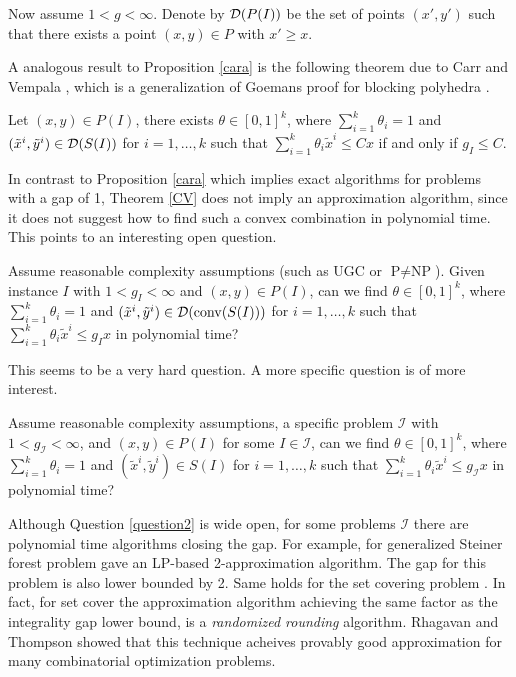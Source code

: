 \documentclass[runningheads]{llncs}
\begin{document}
Now assume $1<g<\infty$. Denote by $\operatorname{\mathcal{D}}(P(I))$ be the set of points $(x',y')$ such that there exists a point $(x,y)\in P$ with $x'\geq x$.

A analogous result to Proposition \ref{cara} is the following theorem due to Carr and Vempala \cite{CV}, which is a generalization of Goemans proof for blocking polyhedra \cite{goemans}. 

\begin{theorem} \label{CV}
	Let $(x,y)\in P(I)$, there exists $\theta \in [0,1]^k$, where $\sum_{i=1}^{k}\theta_i =1$ and $(\tilde{x}^i,\tilde{y}^i)\in \operatorname{\mathcal{D}}(S(I))$ for $i=1,\ldots,k$ such that $\sum_{i=1}^{k}\theta_i \tilde{x}^i\leq Cx$ if and only if $g_I \leq C$.
\end{theorem}

In contrast to Proposition \ref{cara} which implies exact algorithms for problems with a gap of 1, Theorem \ref{CV} does not imply an approximation algorithm, since it does not suggest how to find such a convex combination in polynomial time. This points to an interesting open question. 

\begin{question}\label{question1}
	Assume reasonable complexity assumptions (such as UGC or $\textrm{P}\neq \textrm{NP}$). Given instance $I$ with $1<g_I<\infty$ and $(x,y)\in P(I)$, can we find $\theta \in [0,1]^k$, where $\sum_{i=1}^{k}\theta_i =1$ and $(\tilde{x}^i,\tilde{y}^i)\in \operatorname{\mathcal{D}}(\operatorname{conv}(S(I)))$ for $i=1,\ldots,k$ such that $\sum_{i=1}^{k}\theta_i \tilde{x}^i\leq g_Ix$ in polynomial time?
\end{question}

This seems to be a very hard question. A more specific question is of more interest.

\begin{question}\label{question2}
	Assume reasonable complexity assumptions, a specific problem $\mathcal{I}$ with  $1<g_{\mathcal{I}}<\infty$, and $(x,y)\in P(I)$ for some $I\in \mathcal{I}$, can we find $\theta \in [0,1]^k$, where $\sum_{i=1}^{k}\theta_i =1$ and $(\tilde{x}^i,\tilde{y}^i)\in S(I)$ for $i=1,\ldots,k$ such that $\sum_{i=1}^{k}\theta_i \tilde{x}^i\leq g_{\mathcal{I}}x$ in polynomial time?
\end{question}
Although Question \ref{question2} is wide open, for some problems $\mathcal{I}$ there are polynomial time algorithms closing the gap. For example, for generalized Steiner forest problem \cite{jain} gave an LP-based 2-approximation algorithm. The gap for this problem is also lower bounded by 2. Same holds for the set covering problem \cite{randomizedrounding}. In fact, for set cover the approximation algorithm achieving the same factor as the integrality gap lower bound, is a \textit{randomized rounding} algorithm. Rhagavan and Thompson \cite{randomizedrounding} showed that this technique acheives provably good approximation for many combinatorial optimization problems.  
\end{document}
